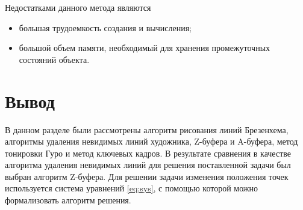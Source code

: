 \vspace{0.3cm}Недостатками данного метода являются
\begin{itemize}
	\item большая трудоемкость создания и вычисления;
	\item большой объем памяти, необходимый для хранения промежуточных состояний объекта.
\end{itemize}

\section{Вывод}
\hspace{0.6cm}В данном разделе были рассмотрены алгоритм рисования линий Брезенхема, алгоритмы удаления невидимых линий художника, Z-буфера и A-буфера, метод тонировки Гуро и метод ключевых кадров. В результате сравнения в качестве алгоритма удаления невидимых линий для решения поставленной задачи был выбран алгоритм Z-буфера.
Для решении задачи изменения положения точек используется система уравнений \ref{eq:sys}, с помощью которой можно формализовать алгоритм решения.
	
